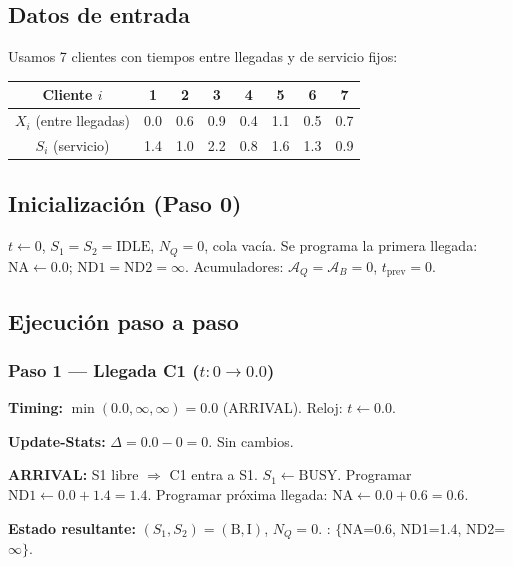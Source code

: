 \documentclass[11pt, letterpaper]{article}
\begin{document}
\subsection{Datos de entrada}

Usamos 7 clientes con tiempos entre llegadas y de servicio fijos:

\begin{center}
\small
\begin{tabular}{@{}cccccccc@{}}
\toprule
Cliente $i$ & 1 & 2 & 3 & 4 & 5 & 6 & 7 \\
\midrule
$X_i$ (entre llegadas) & 0.0 & 0.6 & 0.9 & 0.4 & 1.1 & 0.5 & 0.7 \\
$S_i$ (servicio) & 1.4 & 1.0 & 2.2 & 0.8 & 1.6 & 1.3 & 0.9 \\
\bottomrule
\end{tabular}
\end{center}

\subsection{Inicialización (Paso 0)}

$t \leftarrow 0$, \; $S_1 = S_2 = \text{IDLE}$, \; $N_Q = 0$, \; cola vacía. Se programa la primera llegada: $\text{NA} \leftarrow 0.0$; $\text{ND1} = \text{ND2} = \infty$. Acumuladores: $\mathcal{A}_Q = \mathcal{A}_B = 0$, $t_{\text{prev}} = 0$.

\subsection{Ejecución paso a paso}

\subsubsection*{Paso 1 --- Llegada C1 ($t: 0 \to 0.0$)}

\textbf{Timing:} $\min(0.0, \infty, \infty) = 0.0$ (ARRIVAL). Reloj: $t \leftarrow 0.0$.

\textbf{Update-Stats:} $\Delta = 0.0 - 0 = 0$. Sin cambios.

\textbf{ARRIVAL:} S1 libre $\Rightarrow$ C1 entra a S1. $S_1 \leftarrow \text{BUSY}$. Programar $\text{ND1} \leftarrow 0.0 + 1.4 = 1.4$. Programar próxima llegada: $\text{NA} \leftarrow 0.0 + 0.6 = 0.6$.

\textbf{Estado resultante:} $(S_1, S_2) = (\text{B}, \text{I})$, $N_Q = 0$. \quad \FEL: $\{$NA=0.6, ND1=1.4, ND2=$\infty\}$.
\end{document}
